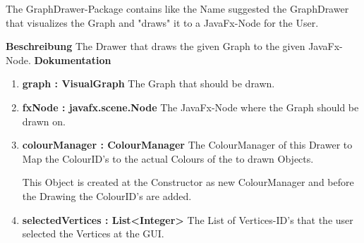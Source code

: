 		The GraphDrawer-Package contains like the Name suggested the GraphDrawer that visualizes the Graph and "draws" it to a JavaFx-Node for the User.
		
				\textbf{Beschreibung}\newline
				The Drawer that draws the given Graph to the given JavaFx-Node.				
				\textbf{Dokumentation}\newline
				\begin{enumerate}[-]
					\item{
						\textbf{graph : VisualGraph} \newline
						The Graph that should be drawn.
					}
					\item{
						\textbf{fxNode : javafx.scene.Node} \newline
						The JavaFx-Node where the Graph should be drawn on.
					}
					\item{
						\textbf{colourManager : ColourManager} \newline
						The ColourManager of this Drawer to Map the ColourID's to the actual Colours of the to drawn Objects.
						
						This Object is created at the Constructor as new ColourManager and before the Drawing the ColourID's are added.
					}
					\item{
						\textbf{selectedVertices : List<Integer>} \newline
						The List of Vertices-ID's that the user selected the Vertices at the GUI.
					}
				\end{enumerate}
